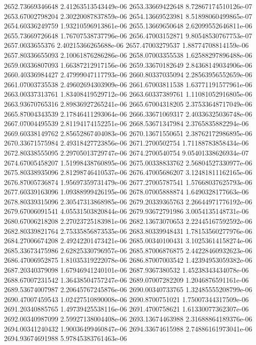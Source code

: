 {2652.73669346648 2.41263513543449e-06
2653.33669422648 8.72867174510126e-07
2653.67002798204 2.30220087837859e-06
2654.13669523981 8.51898060499865e-07
2654.60336249759 1.93210596913861e-06
2655.13669650648 2.62099552646811e-06
2655.73669726648 1.76707538737796e-06
2656.47003152871 9.80548530767753e-07
2657.0033655376 2.40215366265688e-06
2657.47003279537 1.88774708814159e-06
2657.80336655093 2.10061876286286e-06
2658.07003355538 1.62588297896488e-06
2659.00336807093 1.66387212917156e-06
2659.33670182649 2.84368149034906e-06
2660.40336984427 2.47999047117793e-06
2660.80337035094 2.28563956552659e-06
2661.07003735538 2.49602694303909e-06
2661.67003811538 1.63771191577961e-06
2663.00337313761 1.83408419529712e-06
2663.60337389761 1.11081052916805e-06
2663.93670765316 2.89836927265241e-06
2665.67004318205 2.37533648717049e-06
2665.87004343539 2.17846411293064e-06
2666.33671069317 2.40336325036748e-06
2667.07004495539 2.81194174152251e-06
2668.53671347984 2.3765835882294e-06
2669.60338149762 2.85652867404083e-06
2670.13671550651 2.38762172986895e-06
2670.33671575984 2.49318427723856e-06
2671.2700502754 1.71188783858434e-06
2672.80338555095 2.29705013729747e-06
2674.2700540754 9.05401338626934e-07
2674.67005458207 1.51998438760895e-06
2675.00338833762 2.56804527330977e-06
2675.80338935096 2.81298746410537e-06
2676.47005686207 3.12481811162165e-06
2676.87005736874 1.95697359731479e-06
2677.27005787541 1.57668037625793e-06
2677.60339163096 1.09388999426195e-06
2678.07005888874 1.6490328177663e-06
2678.80339315096 2.30547313868985e-06
2679.20339365763 2.26644971776192e-06
2679.67006091541 4.05531503820844e-06
2679.93672791986 3.0054135148731e-06
2680.67006218208 2.27023725183981e-06
2682.13673070653 2.22445167592592e-06
2682.80339821764 2.75335856873535e-06
2683.80339948431 1.78153560277976e-06
2684.27006674208 2.49242201473421e-06
2685.00340100431 3.10253614158274e-06
2685.33673475986 2.62825330796957e-06
2685.87006876875 2.44228460932623e-06
2686.47006952875 1.81035319222078e-06
2686.87007003542 1.42394953059382e-06
2687.20340379098 1.67946941240101e-06
2687.9367380532 1.45238343434078e-06
2688.67007231542 1.36438504757247e-06
2689.07007282209 1.2046876591161e-06
2689.53674007987 2.20645767245876e-06
2690.00340733765 1.32485555208799e-06
2690.47007459543 1.02427510890008e-06
2690.8700751021 1.75007344317509e-06
2691.20340885765 1.49739425538116e-06
2691.4700758621 1.61330077362307e-06
2692.00340987099 2.59927138004408e-06
2693.13674463988 2.31688864189376e-06
2694.00341240432 1.90036499460847e-06
2694.33674615988 2.74886161973041e-06
2694.93674691988 5.97845383761463e-06
}
